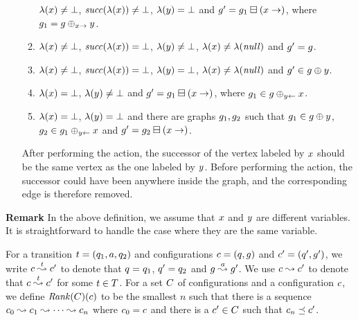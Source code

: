 \begin{enumerate}
\begin{enumerate}
    $\lambda(x)\neq\bot$, %
    ${\it succ}(\lambda(x))\neq\bot$, %
    $\lambda(y)=\bot$ and %
    $g'=g_1\boxminus({x}\rightarrow)$, %
    where $g_1=g\oplus_{{x}\rightarrow}{y}$.
  \item \label{pre:case:dotNextAssignedC}%
    $\lambda(x)\neq\bot$, %
    ${\it succ}(\lambda(x))=\bot$, %
    $\lambda(y)\neq\bot$, %
    $\lambda(x)\neq\lambda({\it null})$ %
    and %
    $g'=g$.
  \item \label{pre:case:dotNextAssignedD}%
    $\lambda(x)\neq\bot$, %
    ${\it succ}(\lambda(x))=\bot$, %
    $\lambda(y)=\bot$, %
    $\lambda(x)\neq\lambda({\it null})$ and %
    $g'\in g\oplus{\ensuremath{y}}$.
  \item \label{pre:case:dotNextAssignedE}%
    $\lambda(x)=\bot$, %
    $\lambda(y)\neq\bot$ and %
    $g'=g_1\boxminus({x}\rightarrow)$, where %
    $g_1\in g\oplus_{{y}\leftarrow}{x}$.
  \item \label{pre:case:dotNextAssignedF}%
    $\lambda(x)=\bot$, %
    $\lambda(y)=\bot$ and %
    there are graphs $g_1,g_2$ such that
    $g_1\in g\oplus{\ensuremath{y}}$, %
    $g_2\in g_1\oplus_{{y}\leftarrow}{x}$ and %
    $g'=g_2\boxminus({x}\rightarrow)$.
  \end{enumerate}
After performing the action, the successor of the vertex labeled by
$x$ should be the same vertex as the one labeled by $y$.
%
Before performing the action, the successor could have been anywhere inside the graph,
and the corresponding edge is therefore removed.
\end{enumerate}
%
{\bf Remark}
In the above definition, we assume that $x$ and $y$ are different variables.
%
It is straightforward to handle the case where they are the same variable.

%
For a transition $t=\left(q_1,a,q_2\right)$ and
configurations $c=\left(q,g\right)$ and
$c'=\left(q',g'\right)$, we write
$c\stackrel{t}{\leadsto}c'$ to denote that
$q=q_1$, $q'=q_2$ and
$g\stackrel{a}{\leadsto}g'$.
%
We use $c\stackrel{}{\leadsto}c'$ to denote that
$c\stackrel{t}{\leadsto}c'$ for some $t\in T$.
%
For a set $C$ of configurations and a configuration $c$, we
define ${\it Rank}(C)(c)$ to be the smallest $n$ such that there
is a sequence
$c_0\stackrel{}{\leadsto}c_1\stackrel{}{\leadsto}\cdots\stackrel{}{\leadsto}c_n$ where
$c_0=c$ and there is a $c'\in C$ such that
$c_n\preceq c'$.

